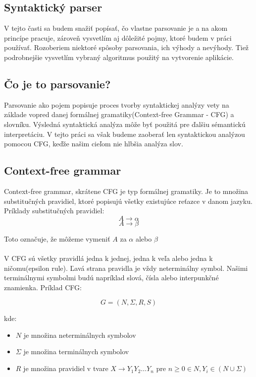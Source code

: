 \documentclass[12pt,a4paper]{report}
\theoremstyle{definition}
\theoremstyle{remark}
\begin{document}
\subsection{Syntaktický parser}
V tejto časti sa budem snažiť popísať, čo vlastne parsovanie je a na akom princípe pracuje, zároveň vysvetlím aj dôležité pojmy, ktoré budem v práci používať. Rozoberiem niektoré spôsoby parsovania, ich výhody a nevýhody. Tiež podrobnejšie vysvetlím vybraný algoritmus použitý na vytvorenie aplikácie.

\subsection{Čo je to parsovanie?}
Parsovanie ako pojem popisuje proces tvorby syntaktickej analýzy vety na základe vopred danej formálnej gramatiky(Context-free Grammar - CFG) a slovníku. Výsledná  syntaktická analýza môže byť použitá pre ďalšiu sémantickú interpretáciu. V tejto práci sa však budeme zaoberať len syntaktickou analýzou pomocou CFG, keďže našim cieľom nie hlbšia analýza slov. \cite{Pulman}\cite{Girju}

\subsection{Context-free grammar}
Context-free grammar\cite{foja}, skrátene CFG je typ formálnej gramatiky. Je to množina substitučných pravidiel, ktoré popisujú všetky existujúce reťazce v danom jazyku. Príklady substitučných pravidiel:
$$ A \to \alpha $$
$$ A \to \beta $$

Toto označuje, že môžeme vymeniť $A$ za $\alpha$ alebo $\beta$ \\ \\
V CFG sú všetky pravidlá jedna k jednej, jedna k veľa alebo jedna k ničomu(epsilon rule). Ľavá strana pravidla je vždy neterminálny symbol. Našimi terminálnymi symbolmi budú napríklad slová, čísla alebo interpunkčné znamienka. Príklad CFG:

$$ G = (N, \Sigma , R, S) $$

kde:
\begin{itemize}
\item $N$ je množina neterminálnych symbolov
\item $\Sigma$ je množina terminálnych symbolov
\item $R$ je množina pravidiel v tvare $X \to Y_1 Y_2 \dots Y_n$ pre $ n \geq 0 \in N, Y_i \in ( N \cup \Sigma )$
\end{itemize}
\end{document}
